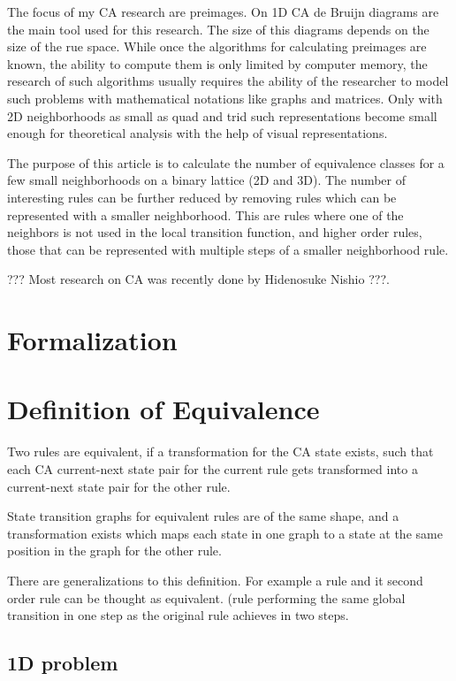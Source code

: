 \documentclass{ijuc}
\begin{document}
The focus of my CA research are preimages. On 1D CA de Bruijn diagrams are the main tool
used for this research. The size of this diagrams depends on the size of the rue space.
While once the algorithms for calculating preimages are known, the ability to compute
them is only limited by computer memory, the research of such algorithms usually requires
the ability of the researcher to model such problems with mathematical notations like
graphs and matrices. Only with 2D neighborhoods as small as quad and trid such representations
become small enough for theoretical analysis with the help of visual representations.

The purpose of this article is to calculate the number of equivalence classes for a few small
neighborhoods on a binary lattice (2D and 3D). The number of interesting rules can be further
reduced by removing rules which can be represented with a smaller neighborhood. This are rules
where one of the neighbors is not used in the local transition function, and higher order rules,
those that can be represented with multiple steps of a smaller neighborhood rule.


??? Most research on CA was recently done by Hidenosuke Nishio ???.

\section{Formalization}



\section{Definition of Equivalence}

Two rules are equivalent, if a transformation for the CA state exists, such that each CA
current-next state pair for the current rule gets transformed into a current-next state pair
for the other rule.

State transition graphs for equivalent rules are of the same shape, and a transformation exists
which maps each state in one graph to a state at the same position in the graph for the other rule.

There are generalizations to this definition. For example a rule and it second order rule can be thought as equivalent.
(rule performing the same global transition in one step as the original rule achieves in two steps.

\subsection{1D problem}
\end{document}
